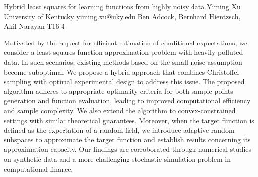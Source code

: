 \begin{talk}
  {Hybrid least squares for learning functions from highly noisy data}%
  {Yiming Xu}%
  {University of Kentucky}%
  {yiming.xu@uky.edu}%
  {Ben Adcock, Bernhard Hientzsch, Akil Narayan}%
  {T16-4}%
			
Motivated by the request for efficient estimation of conditional expectations, we consider a least-squares function approximation problem with heavily polluted data. In such scenarios, existing methods based on the small noise assumption become suboptimal. We propose a hybrid approach that combines Christoffel sampling with optimal experimental design to address this issue. The proposed algorithm adheres to appropriate optimality criteria for both sample points generation and function evaluation, leading to improved computational efficiency and sample complexity. We also extend the algorithm to convex-constrained settings with similar theoretical guarantees. Moreover, when the target function is defined as the expectation of a random field, we introduce adaptive random subspaces to approximate the target function and establish results concerning its approximation capacity. Our findings are corroborated through numerical studies on synthetic data and a more challenging stochastic simulation problem in computational finance.
\medskip

\end{talk}

